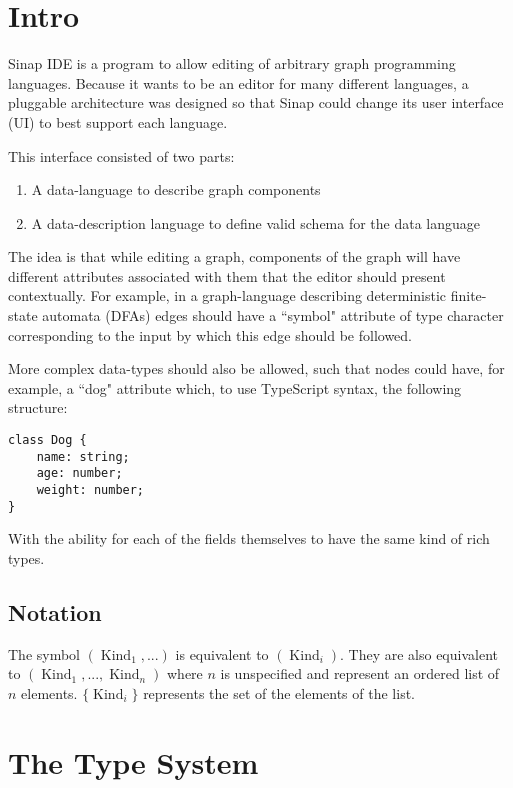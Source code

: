 \documentclass{article}
\begin{document}
\section{Intro}

Sinap IDE is a program to allow editing of arbitrary graph
programming languages. Because it wants to be an editor for 
many different languages, a pluggable architecture was 
designed so that Sinap could change its user interface (UI)
to best support each language. 

This interface consisted of two parts:

\begin{enumerate}
    \item A data-language to describe graph components
    \item A data-description language to define valid schema
    for the data language
\end{enumerate}

The idea is that while editing a graph, components of the
graph will have different attributes associated with them 
that the editor should present contextually. For example, in
a graph-language describing deterministic finite-state 
automata (DFAs) edges should have a ``symbol" attribute of 
type character corresponding to the input by which this 
edge should be followed. 

More complex data-types should also be allowed, such that
nodes could have, for example, a ``dog" attribute which, 
to use TypeScript syntax, the following structure:

\begin{verbatim}
class Dog {
    name: string;
    age: number;
    weight: number;
}
\end{verbatim}

With the ability for each of the fields themselves to have the 
same kind of rich types. 

\subsection{Notation}
The symbol \((\operatorname{Kind}_1, ...)\) is equivalent to 
\((\operatorname{Kind}_i)\). They are also equivalent to 
\((\operatorname{Kind}_1, ..., \operatorname{Kind}_n)\)
where \(n\) is unspecified and represent an ordered list 
of \(n\) elements. \(\{\operatorname{Kind}_i\}\) represents 
the set of the elements of the list. 

\section{The Type System}
\end{document}
